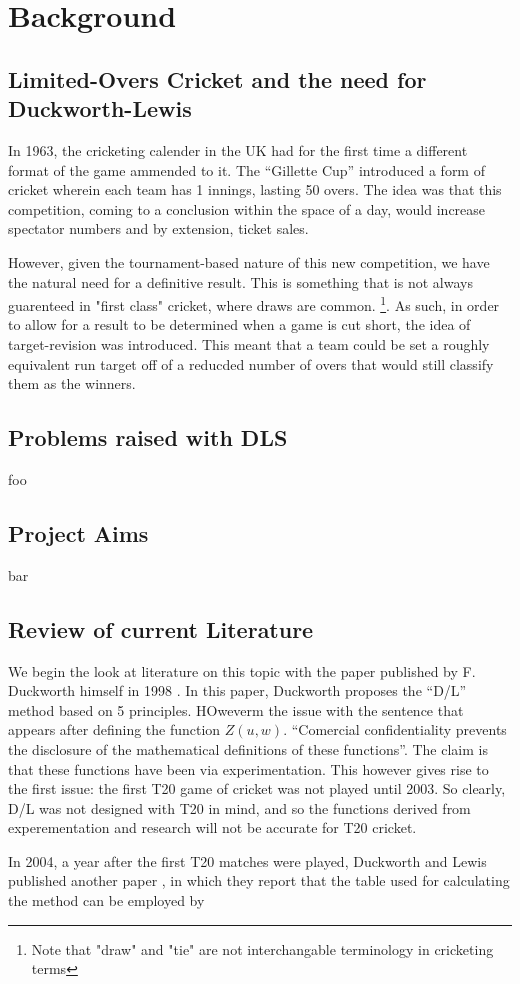 \chapter{Background}

\section{Limited-Overs Cricket and the need for Duckworth-Lewis}
In 1963, the cricketing calender in the UK had for the first time a different format of the game ammended to it.
The ``Gillette Cup'' introduced a form of cricket wherein each team has 1 innings, lasting 50 overs. The idea was 
that this competition, coming to a conclusion within the space of a day, would increase spectator numbers and by extension,
ticket sales.

However, given the tournament-based nature of this new competition, we have the natural need for a definitive result.
This is something that is not always guarenteed in "first class" cricket, where draws are common. \footnote{Note that 
"draw" and "tie" are not interchangable terminology in cricketing terms}. As such, in order to allow for a result to be
determined when a game is cut short, the idea of target-revision was introduced. This meant that a team could be set a
roughly equivalent run target off of a reducded number of overs that would still classify them as the winners.

\section{Problems raised with DLS}
foo

\section{Project Aims}
bar

\section{Review of current Literature}
We begin the look at literature on this topic with the paper published by F. Duckworth himself in 1998 \cite{duckworth}. In this paper, 
Duckworth proposes the ``D/L'' method based on 5 principles. HOweverm the issue with the sentence that appears after defining the function $Z(u,w)$.
``Comercial confidentiality prevents the disclosure of the mathematical definitions of these functions''. The claim is that these functions have been 
via experimentation. This however gives rise to the first issue: the first T20 game of cricket was not played until 2003. So clearly, D/L was not
designed with T20 in mind, and so the functions derived from experementation and research will not be accurate for T20 cricket. 

In 2004, a year after the first T20 matches were played, Duckworth and Lewis published another paper \cite{duckworth2}, in which they report
that the table used for calculating the method can be employed by 
